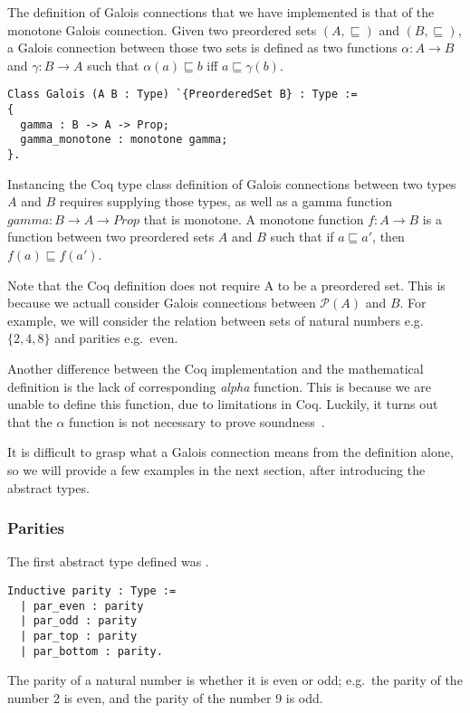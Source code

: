The definition of Galois connections that we have implemented is that of the
monotone Galois connection. Given two preordered sets $(A,\sqsubseteq)$ and
$(B,\sqsubseteq)$, a Galois connection between those two sets is defined as two
functions $\alpha : A \rightarrow B$ and $\gamma : B \rightarrow A$ such 
that $\alpha(a)
\sqsubseteq b$ iff $a \sqsubseteq \gamma(b)$.

\begin{verbatim}
Class Galois (A B : Type) `{PreorderedSet B} : Type :=
{
  gamma : B -> A -> Prop;
  gamma_monotone : monotone gamma;
}.
\end{verbatim}

Instancing the Coq type class definition of Galois connections between two
types $A$ and $B$ requires supplying those types, as well as a gamma function
$gamma : B \rightarrow A \rightarrow Prop$ that is monotone. 
A monotone function $f : A \rightarrow B$ is
a function between two preordered sets $A$ and $B$ such that if $a \sqsubseteq
a'$, then $f(a) \sqsubseteq f(a')$.

Note that the Coq definition does not require A to be a preordered set. This is
because we actuall consider Galois connections between $\mathcal{P}(A)$ and
$B$. For example, we will consider the relation between sets of natural numbers
e.g.\ $\{2, 4, 8\}$ and parities e.g.\ even.

Another difference between the Coq implementation and the mathematical
definition is the lack of corresponding \textit{alpha} function. This is
because we are unable to define this function, due to limitations in Coq.
Luckily, it turns out that the $\alpha$ function is not necessary to prove
soundness~\cite{jourdan2016verasco}.

It is difficult to grasp what a Galois connection means from the definition
alone, so we will provide a few examples in the next section, after
introducing the abstract types.

\subsubsection{Parities}
The first abstract type defined was .

\begin{verbatim}
Inductive parity : Type :=
  | par_even : parity
  | par_odd : parity
  | par_top : parity
  | par_bottom : parity.
\end{verbatim}

The parity of a natural number is whether it is even or odd; e.g.\ the parity
of the number 2 is even, and the parity of the number 9 is odd.

